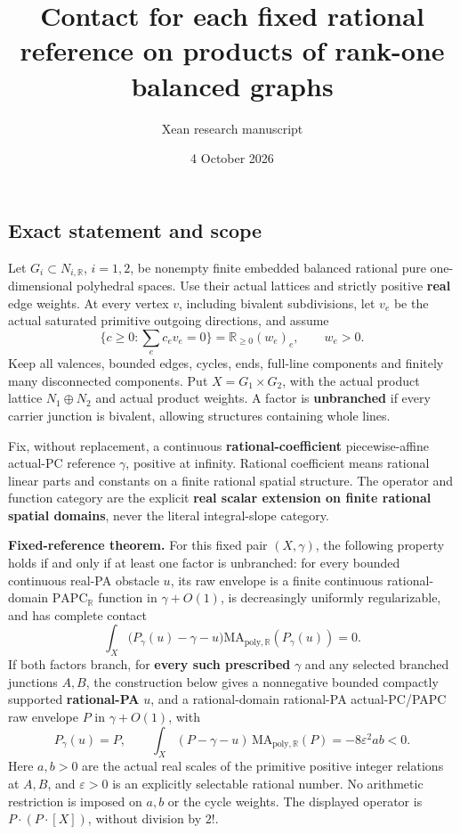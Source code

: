 \documentclass[
  11pt,
]{article}
\title{Contact for each fixed rational reference on products of rank-one
balanced graphs}
\author{Xean research manuscript}
\date{4 October 2026}
\begin{document}
\maketitle

\subsection{Exact statement and scope}\label{exact-statement-and-scope}

Let \(G_i\subset N_{i,\mathbb{R}}\), \(i=1,2\), be nonempty finite
embedded balanced rational pure one-dimensional polyhedral spaces. Use
their actual lattices and strictly positive \textbf{real} edge weights.
At every vertex \(v\), including bivalent subdivisions, let \(v_e\) be
the actual saturated primitive outgoing directions, and assume \[
\{c\geq0:\sum_e c_e v_e=0\}=\mathbb{R}_{\geq0}(w_e)_e,
\qquad w_e>0.                                                    \tag{1}
\] Keep all valences, bounded edges, cycles, ends, full-line components
and finitely many disconnected components. Put \(X=G_1\times G_2\), with
the actual product lattice \(N_1\oplus N_2\) and actual product weights.
A factor is \textbf{unbranched} if every carrier junction is bivalent,
allowing structures containing whole lines.

Fix, without replacement, a continuous \textbf{rational-coefficient}
piecewise-affine actual-PC reference \(\gamma\), positive at infinity.
Rational coefficient means rational linear parts and constants on a
finite rational spatial structure. The operator and function category
are the explicit \textbf{real scalar extension on finite rational
spatial domains}, never the literal integral-slope category.

\textbf{Fixed-reference theorem.} For this fixed pair
\((X,\gamma)\), the following property holds if and only if at least one
factor is unbranched: for every bounded continuous real-PA obstacle
\(u\), its raw envelope is a finite continuous rational-domain
\(\mathrm{PAPC}_{\mathbb{R}}\) function in \(\gamma+O(1)\), is
decreasingly uniformly regularizable, and has complete contact \[
\int_X\bigl(P_\gamma(u)-\gamma-u\bigr)
              \mathrm{MA}_{\mathrm{poly},\mathbb{R}}(P_\gamma(u))=0.       \tag{2}
\] If both factors branch, for \textbf{every such prescribed} \(\gamma\)
and any selected branched junctions \(A,B\), the construction below
gives a nonnegative bounded compactly supported \textbf{rational-PA}
\(u\), and a rational-domain rational-PA actual-PC/PAPC raw envelope
\(P\) in \(\gamma+O(1)\), with \[
P_\gamma(u)=P,\qquad
\int_X(P-\gamma-u)\,\mathrm{MA}_{\mathrm{poly},\mathbb{R}}(P)
                  =-8\varepsilon^2ab<0.                              \tag{3}
\] Here \(a,b>0\) are the actual real scales of the primitive positive
integer relations at \(A,B\), and \(\varepsilon>0\) is an explicitly
selectable rational number. No arithmetic restriction is imposed on
\(a,b\) or the cycle weights. The displayed operator is
\(P\cdot(P\cdot[X])\), without division by \(2!\).
\end{document}
